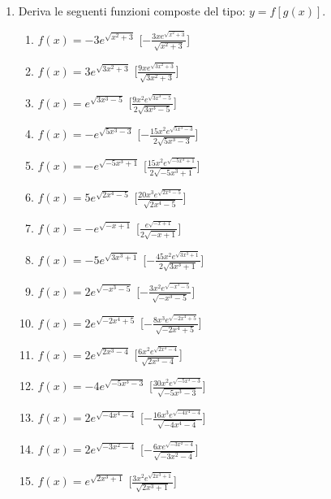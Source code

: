 \begin{enumerate}
\pagebreak %

\item Deriva le seguenti funzioni composte del tipo: \(y=f[g(x)]\).

\begin{multicols}{2}
\begin{enumerate}
\item \(f(x) = - 3 e^{\sqrt{x^{2} + 3}}\) \hfill [\(- \frac{3 x e^{\sqrt{x^{2} + 
3}}}{\sqrt{x^{2} + 3}}\)]
\item \(f(x) = 3 e^{\sqrt{3 x^{2} + 3}}\) \hfill [\(\frac{9 x e^{\sqrt{3 x^{2} + 
3}}}{\sqrt{3 x^{2} + 3}}\)]
\item \(f(x) = e^{\sqrt{3 x^{3} - 5}}\) \hfill [\(\frac{9 x^{2} e^{\sqrt{3 x^{3} 
- 5}}}{2 \sqrt{3 x^{3} - 5}}\)]
\item \(f(x) = - e^{\sqrt{5 x^{3} - 3}}\) \hfill [\(- \frac{15 x^{2} e^{\sqrt{5 
x^{3} - 3}}}{2 \sqrt{5 x^{3} - 3}}\)]
\item \(f(x) = - e^{\sqrt{- 5 x^{3} + 1}}\) \hfill [\(\frac{15 x^{2} e^{\sqrt{- 
5 x^{3} + 1}}}{2 \sqrt{- 5 x^{3} + 1}}\)]
\item \(f(x) = 5 e^{\sqrt{2 x^{4} - 5}}\) \hfill [\(\frac{20 x^{3} e^{\sqrt{2 
x^{4} - 5}}}{\sqrt{2 x^{4} - 5}}\)]
\item \(f(x) = - e^{\sqrt{- x + 1}}\) \hfill [\(\frac{e^{\sqrt{- x + 1}}}{2 
\sqrt{- x + 1}}\)]
\item \(f(x) = - 5 e^{\sqrt{3 x^{3} + 1}}\) \hfill [\(- \frac{45 x^{2} 
e^{\sqrt{3 x^{3} + 1}}}{2 \sqrt{3 x^{3} + 1}}\)]
\item \(f(x) = 2 e^{\sqrt{- x^{3} - 5}}\) \hfill [\(- \frac{3 x^{2} e^{\sqrt{- 
x^{3} - 5}}}{\sqrt{- x^{3} - 5}}\)]
\item \(f(x) = 2 e^{\sqrt{- 2 x^{4} + 5}}\) \hfill [\(- \frac{8 x^{3} e^{\sqrt{- 
2 x^{4} + 5}}}{\sqrt{- 2 x^{4} + 5}}\)]
\item \(f(x) = 2 e^{\sqrt{2 x^{3} - 4}}\) \hfill [\(\frac{6 x^{2} e^{\sqrt{2 
x^{3} - 4}}}{\sqrt{2 x^{3} - 4}}\)]
\item \(f(x) = - 4 e^{\sqrt{- 5 x^{3} - 3}}\) \hfill [\(\frac{30 x^{2} 
e^{\sqrt{- 5 x^{3} - 3}}}{\sqrt{- 5 x^{3} - 3}}\)]
\item \(f(x) = 2 e^{\sqrt{- 4 x^{4} - 4}}\) \hfill [\(- \frac{16 x^{3} 
e^{\sqrt{- 4 x^{4} - 4}}}{\sqrt{- 4 x^{4} - 4}}\)]
\item \(f(x) = 2 e^{\sqrt{- 3 x^{2} - 4}}\) \hfill [\(- \frac{6 x e^{\sqrt{- 3 
x^{2} - 4}}}{\sqrt{- 3 x^{2} - 4}}\)]
\item \(f(x) = e^{\sqrt{2 x^{3} + 1}}\) \hfill [\(\frac{3 x^{2} e^{\sqrt{2 x^{3} 
+ 1}}}{\sqrt{2 x^{3} + 1}}\)]
\end{enumerate}
\end{multicols}


\end{enumerate}

